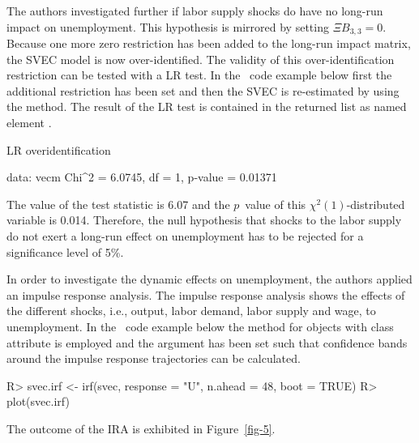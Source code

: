\documentclass[nojss]{jss}
\begin{document}
The authors investigated further if labor supply shocks do have no 
long-run impact on unemployment. This hypothesis is mirrored by
setting $\Xi B_{3, 3} = 0$. Because one more zero restriction has been
added to the long-run impact matrix, the SVEC model is now
over-identified. The validity of this over-identification restriction
can be tested with a LR test. In the ~code example below
first the additional restriction has been set and then the SVEC is
re-estimated by using the  method. The result of the LR
test is contained in the returned list as named element .
\begin{Schunk}
\begin{Soutput}
	LR overidentification

data:  vecm 
Chi^2 = 6.0745, df = 1, p-value = 0.01371
\end{Soutput}
\end{Schunk}
The value of the test statistic is
6.07 and the $p$~value of this
$\chi^2(1)$-distributed variable is
0.014. Therefore, the null
hypothesis that shocks to the labor supply do not exert a long-run
effect on unemployment has to be rejected for a significance level of
5\%.

In order to investigate the dynamic effects on unemployment, the
authors applied an impulse response analysis. The impulse response
analysis shows the effects of the different shocks, i.e.,
output, labor demand, labor supply and wage, to unemployment. In the
~code example below the  method for objects with
class attribute  is employed and the argument  has been set such that confidence bands around the impulse
response trajectories can be calculated. 
\begin{Schunk}
\begin{Sinput}
R> svec.irf <- irf(svec, response = "U", n.ahead = 48, boot = TRUE)
R> plot(svec.irf)
\end{Sinput}
\end{Schunk}
The outcome of the IRA is exhibited in Figure~\ref{fig-5}.
 
\end{document}
